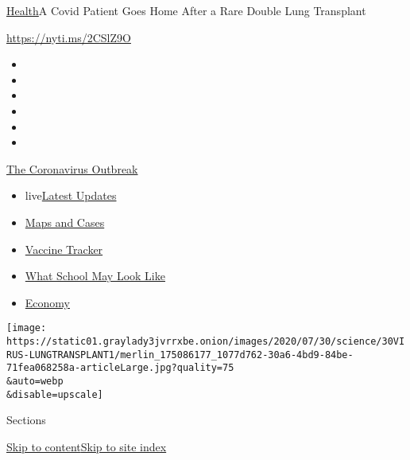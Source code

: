 \href{/section/health}{Health}\textbar{}A Covid Patient Goes Home After
a Rare Double Lung Transplant

\url{https://nyti.ms/2CSlZ9O}

\begin{itemize}
\item
\item
\item
\item
\item
\item
\end{itemize}

\href{https://www.nytimes3xbfgragh.onion/news-event/coronavirus?action=click\&pgtype=Article\&state=default\&region=TOP_BANNER\&context=storylines_menu}{The
Coronavirus Outbreak}

\begin{itemize}
\tightlist
\item
  live\href{https://www.nytimes3xbfgragh.onion/2020/08/01/world/coronavirus-covid-19.html?action=click\&pgtype=Article\&state=default\&region=TOP_BANNER\&context=storylines_menu}{Latest
  Updates}
\item
  \href{https://www.nytimes3xbfgragh.onion/interactive/2020/us/coronavirus-us-cases.html?action=click\&pgtype=Article\&state=default\&region=TOP_BANNER\&context=storylines_menu}{Maps
  and Cases}
\item
  \href{https://www.nytimes3xbfgragh.onion/interactive/2020/science/coronavirus-vaccine-tracker.html?action=click\&pgtype=Article\&state=default\&region=TOP_BANNER\&context=storylines_menu}{Vaccine
  Tracker}
\item
  \href{https://www.nytimes3xbfgragh.onion/interactive/2020/07/29/us/schools-reopening-coronavirus.html?action=click\&pgtype=Article\&state=default\&region=TOP_BANNER\&context=storylines_menu}{What
  School May Look Like}
\item
  \href{https://www.nytimes3xbfgragh.onion/live/2020/07/31/business/stock-market-today-coronavirus?action=click\&pgtype=Article\&state=default\&region=TOP_BANNER\&context=storylines_menu}{Economy}
\end{itemize}

\texttt{[image: https://static01.graylady3jvrrxbe.onion/images/2020/07/30/science/30VIRUS-LUNGTRANSPLANT1/merlin\_175086177\_1077d762-30a6-4bd9-84be-71fea068258a-articleLarge.jpg?quality=75\\\&auto=webp\\\&disable=upscale]}

Sections

\protect\hyperlink{site-content}{Skip to
content}\protect\hyperlink{site-index}{Skip to site index}

